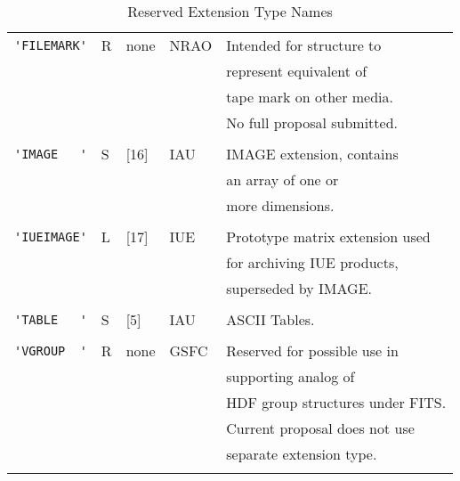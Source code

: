 \begin{table}[htpb]
\begin{center}
\begin{tabular}{lllll}
\verb*+'FILEMARK'+ & R & none & NRAO & Intended\index{FILEMARK} 
                                       for structure to \\ 
                   &   &      &      & represent equivalent of \\ 
                   &   &      &      & tape mark on other media. \\
                   &   &      &      & No full proposal submitted. \\  
                   &   &      &      &                          \\  
\verb*+'IMAGE   '+ & S & [16] & IAU  & IMAGE extension, contains \\
                   &   &      &      & an array\index{IMAGE} of one or \\
                   &   &      &      & more dimensions. \\
                   &   &      &      &                          \\  
\verb*+'IUEIMAGE'+ & L & [17] & IUE  & Prototype matrix extension 
                                       used   \\
                   &   &      &      & for archiving\index{IUEIMAGE} 
                                       IUE products, \\
                   &   &      &      & superseded by IMAGE.       \\  
                   &   &      &      &                          \\  
\verb*+'TABLE   '+ & S & [5]  & IAU  & ASCII\index{TABLE} Tables. \\
                   &   &      &      &                       \\ 
\verb*+'VGROUP  '+ & R & none & GSFC & Reserved for possible use in \\
                   &   &      &      & supporting analog of      \\
                   &   &      &      & HDF group structures under FITS. \\
                   &   &      &      & Current proposal does not use \\  
                   &   &      &      & separate extension type.\\  
                   &     &        &                       \\ \hline

\end{tabular}
\end{center}
\caption[Reserved Extension Type Names]{Reserved Extension Type
Names}
\end{table}

